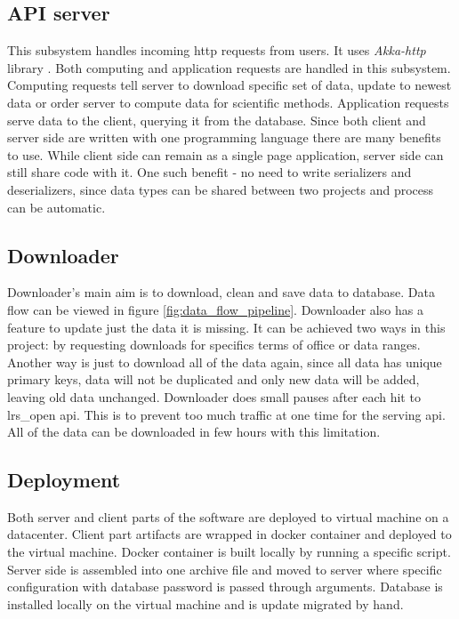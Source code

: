 \documentclass[a4paper,12pt]{article}
\begin{document}
	\subsection{API server}
	
	This subsystem handles incoming \gls{http} requests from users. It uses \textit{Akka-http} library \cite{akka_http}. Both computing and application requests are handled in this subsystem. Computing requests tell server to download specific set of data, update to newest data or order server to compute data for scientific methods. Application requests serve data to the client, querying it from the database. Since both client and server side are written with one programming language there are many benefits to use. While client side can remain as a single page application, server side can still share code with it. One such benefit - no need to write serializers and deserializers, since data types can be shared between two projects and process can be automatic. 
	
	\subsection{Downloader}
	
	Downloader's main aim is to download, clean and save data to database. Data flow can be viewed in figure \ref{fig:data_flow_pipeline}. Downloader also has a feature to update just the data it is missing. It can be achieved two ways in this project: by requesting downloads for specifics terms of office or data ranges. Another way is just to download all of the data again, since all data has unique primary keys, data will not be duplicated and only new data will be added, leaving old data unchanged. Downloader does small pauses after each hit to \gls{lrs_open} \acrshort{api}. This is to prevent too much traffic at one time for the serving \acrshort{api}. All of the data can be downloaded in few hours with this limitation.
	
	\subsection{Deployment}
	
	Both server and client parts of the software are deployed to virtual machine on a datacenter. Client part artifacts are wrapped in \gls{docker} container and deployed to the virtual machine. Docker container is built locally by running a specific script. Server side is assembled into one archive file and moved to server where specific configuration with database password is passed through arguments. Database is installed locally on the virtual machine and is update migrated by hand.
	
\end{document}
